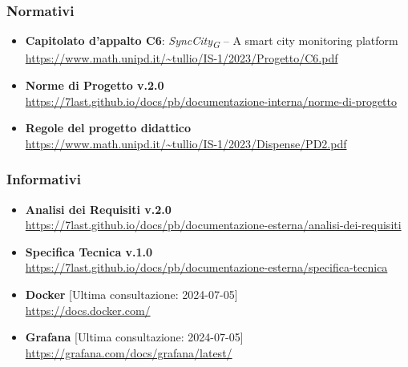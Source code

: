     \subsubsection{Normativi}
        \begin{itemize}
            \item \textbf{Capitolato d'appalto C6}: \textit{SyncCity\textsubscript{G} } – A smart city monitoring platform\\
            \url{https://www.math.unipd.it/~tullio/IS-1/2023/Progetto/C6.pdf}
            \item \textbf{Norme di Progetto v.2.0}\\
            \url{https://7last.github.io/docs/pb/documentazione-interna/norme-di-progetto}
            \item \textbf{Regole del progetto didattico}\\
            \url{https://www.math.unipd.it/~tullio/IS-1/2023/Dispense/PD2.pdf}
        \end{itemize}
    \subsubsection{Informativi}
        \begin{itemize}
            \item \textbf{Analisi dei Requisiti v.2.0}\\
            \url{https://7last.github.io/docs/pb/documentazione-esterna/analisi-dei-requisiti}
            \item \textbf{Specifica Tecnica v.1.0}\\
            \url{https://7last.github.io/docs/pb/documentazione-esterna/specifica-tecnica}
            \item \textbf{Docker} [Ultima consultazione: 2024-07-05]\\ \url{https://docs.docker.com/} 
            \item \textbf{Grafana} [Ultima consultazione: 2024-07-05]\\ \url{https://grafana.com/docs/grafana/latest/}
        \end{itemize}
    